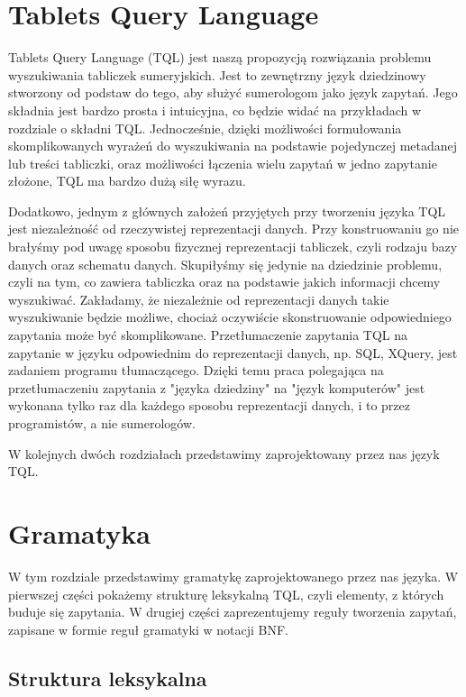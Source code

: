 \chapter{Tablets Query Language}
Tablets Query Language (TQL) jest naszą propozycją rozwiązania problemu wyszukiwania tabliczek sumeryjskich. Jest to zewnętrzny język dziedzinowy stworzony od podstaw do tego, aby służyć sumerologom jako język zapytań. Jego składnia jest bardzo prosta i intuicyjna, co będzie widać na przykładach w rozdziale o składni TQL. Jednocześnie, dzięki możliwości formułowania skomplikowanych wyrażeń do wyszukiwania na podstawie pojedynczej metadanej lub treści tabliczki, oraz możliwości łączenia wielu zapytań w jedno zapytanie złożone, TQL ma bardzo dużą siłę wyrazu.

Dodatkowo, jednym z głównych założeń przyjętych przy tworzeniu języka TQL jest niezależność od rzeczywistej reprezentacji danych. Przy konstruowaniu go nie brałyśmy pod uwagę sposobu fizycznej reprezentacji tabliczek, czyli rodzaju bazy danych oraz schematu danych. Skupiłyśmy się jedynie na dziedzinie problemu, czyli na tym, co zawiera tabliczka oraz na podstawie jakich informacji chcemy wyszukiwać. Zakładamy, że niezależnie od reprezentacji danych takie wyszukiwanie będzie możliwe, chociaż oczywiście skonstruowanie odpowiedniego zapytania może być skomplikowane. Przetłumaczenie zapytania TQL na zapytanie w języku odpowiednim do reprezentacji danych, np. SQL, XQuery, jest zadaniem programu tłumaczącego. Dzięki temu praca polegająca na przetłumaczeniu zapytania z "języka dziedziny" na "język komputerów" jest wykonana tylko raz dla każdego sposobu reprezentacji danych, i to przez programistów, a nie sumerologów.

W kolejnych dwóch rozdziałach przedstawimy zaprojektowany przez nas język TQL.

\chapter{Gramatyka}

W tym rozdziale przedstawimy gramatykę zaprojektowanego przez nas języka. W pierwszej części pokażemy strukturę leksykalną TQL, czyli elementy, z których buduje się zapytania. W drugiej części zaprezentujemy reguły tworzenia zapytań, zapisane w formie reguł gramatyki w notacji BNF.

\section{Struktura leksykalna}
